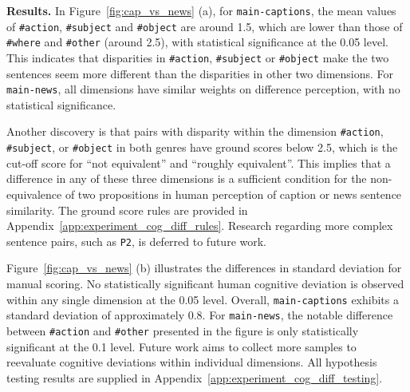 \textbf{Results.} In Figure~\ref{fig:cap_vs_news} (a), for \texttt{main-captions}, the mean values of \texttt{\#action}, \texttt{\#subject} and \texttt{\#object} are around 1.5, which are lower than those of \texttt{\#where} and \texttt{\#other} (around 2.5), with statistical significance at the 0.05 level. This indicates that disparities in \texttt{\#action}, \texttt{\#subject} or \texttt{\#object} make the two sentences seem more different than the disparities in other two dimensions. For \texttt{main-news}, all dimensions have similar weights on difference perception, with no statistical significance. 

Another discovery is that pairs with disparity within the dimension \texttt{\#action}, \texttt{\#subject}, or \texttt{\#object} in both genres have ground scores below 2.5, which is the cut-off score for ``not equivalent'' and ``roughly equivalent''. This implies that a difference in any of these three dimensions is a sufficient condition for the non-equivalence of two propositions in human perception of caption or news sentence similarity. The ground score rules are provided in Appendix~\ref{app:experiment_cog_diff_rules}. Research regarding more complex sentence pairs, such as \texttt{P2}, is deferred to future work.

Figure~\ref{fig:cap_vs_news} (b) illustrates the differences in standard deviation for manual scoring. No statistically significant human cognitive deviation is observed within any single dimension at the 0.05 level. Overall, \texttt{main-captions} exhibits a standard deviation of approximately 0.8. For \texttt{main-news}, the notable difference between \texttt{\#action} and \texttt{\#other} presented in the figure is only statistically significant at the 0.1 level. Future work aims to collect more samples to reevaluate cognitive deviations within individual dimensions. All hypothesis testing results are supplied in Appendix~\ref{app:experiment_cog_diff_testing}.
